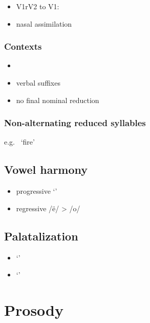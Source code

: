 \documentclass{memoir}
\begin{document}
\begin{itemize}
\tightlist
\item
  V1rV2 to V1:
\item
  nasal assimilation
\end{itemize}

\subsubsection{Contexts}

\begin{itemize}
\item
\item
  verbal suffixes
\item
  no final nominal reduction
\end{itemize}

\subsubsection{Non-alternating reduced syllables}

e.g.~ `fire'

\subsection{\texorpdfstring{Vowel harmony
\label{sec:vowelharm}}{Vowel harmony }}

\begin{itemize}
\tightlist
\item
  progressive  `'
\item
  regressive /ë/ \textgreater{} /o/
\end{itemize}

\subsection{\texorpdfstring{Palatalization
\label{sec:palatalization}}{Palatalization }}

\begin{itemize}
\tightlist
\item
   `'
\item
   `'
\end{itemize}

\section{\texorpdfstring{Prosody \label{sec:prosody}}{Prosody }}
\end{document}
